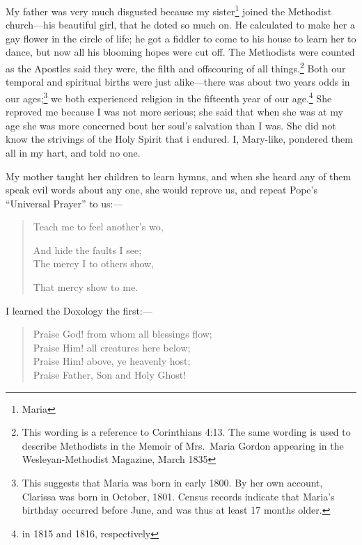 My father was very much disgusted because my sister\footnote{Maria} joined the Methodist church---his beautiful girl, that he doted so much on.
He calculated to make her a gay flower in the circle of life; he got a fiddler to come to his house to learn her to dance, but now all his blooming hopes were cut off.
The Methodists were counted as the Apostles said they were, the filth and offscouring of all things.\footnote{This wording is a reference to Corinthians 4:13. The same wording is used to describe Methodists in the Memoir of Mrs.\ Maria Gordon appearing in the Wesleyan-Methodist Magazine, March 1835}
Both our temporal and spiritual births were just alike---there was about two years odds in our ages;\footnote{This suggests that Maria was born in early 1800. By her own account, Clarissa was born in October, 1801. Census records indicate that Maria's birthday occurred before June, and was thus at least 17 months older.} we both%
\markpage%
experienced religion in the fifteenth year of our age.\footnote{in 1815 and 1816, respectively}
She reproved me because I was not more serious; she said that when she was at my age she was more concerned bout her soul's salvation than I was.
She did not know the strivings of the Holy Spirit that i endured.
I, Mary-like, pondered them all in my hart, and told no one.

My mother taught her children to learn hymns, and when she heard any of them speak evil words about any one, she would reprove us, and repeat Pope's ``Universal Prayer'' to us:---
\begin{quote}
\setlength{\parindent}{2ex}
    Teach me to feel another's wo,
    \setlength{\parskip}{0pt}
    \par And hide the faults I see;\\
    The mercy I to others show,
    \par That mercy show to me.
\end{quote}

I learned the Doxology the first:---
\begin{quote}
    Praise God! from whom all blessings flow;\\
    Praise Him! all creatures here below;\\
    Praise Him! above, ye heavenly host;\\
    Praise Father, Son and Holy Ghost!
\end{quote}

